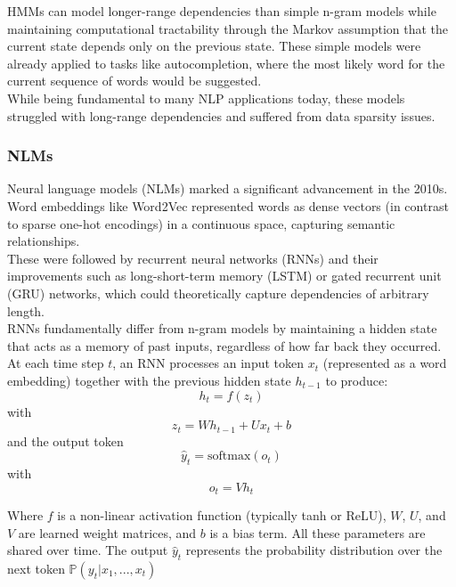 \documentclass[%
thesis=student,%
coverpage=false,%
titlepage=false,%
headmarks=true, %
english,%
font=libertine, %
math=newpxtx, %
BCOR=5mm,%
coverBCOR=11mm%
]{tum-templates/book/tumbook}
\begin{document}
HMMs can model longer-range dependencies than simple n-gram models while maintaining computational tractability through the Markov assumption that the current state depends only on the previous state. These simple models were already applied to tasks like autocompletion, where the most likely word for the current sequence of words would be suggested. \\
While being fundamental to many NLP applications today, these models struggled with long-range dependencies and suffered from data sparsity issues.

\subsubsection{NLMs}
Neural language models (NLMs) marked a significant advancement in the 2010s. Word embeddings like Word2Vec \cite{Mikolov2013} represented words as dense vectors (in contrast to sparse one-hot encodings) in a continuous space, capturing semantic relationships. \\

These were followed by recurrent neural networks (RNNs) and their improvements such as long-short-term memory (LSTM) or gated recurrent unit (GRU) networks, which could theoretically capture dependencies of arbitrary length. \\

RNNs fundamentally differ from n-gram models by maintaining a hidden state that acts as a memory of past inputs, regardless of how far back they occurred. At each time step $t$, an RNN processes an input token $x_t$ (represented as a word embedding) together with the previous hidden state $h_{t-1}$ to produce:
\begin{equation}
    h_t = f(z_t)
\end{equation}
with
\begin{equation}
    z_t = Wh_{t-1} + Ux_t + b
\end{equation}
and the output token
\begin{equation}
    \hat{y}_t = \text{softmax}(o_t)
\end{equation}
with
\begin{equation}
    o_t = Vh_t
\end{equation}

Where $f$ is a non-linear activation function (typically tanh or ReLU), $W$, $U$, and $V$ are learned weight matrices, and $b$ is a bias term. All these parameters are shared over time. The output $\hat{y}_t$ represents the probability distribution over the next token $\mathbb{P}(y_t|x_1,...,x_t)$
\end{document}
